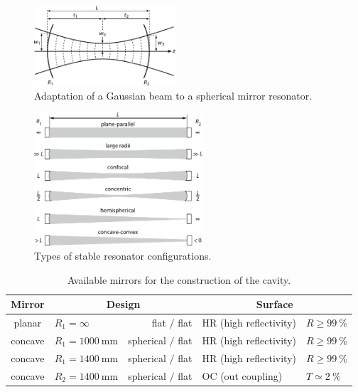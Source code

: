 \begin{figure}[H]
	\centering
	\includegraphics[width=0.47\textwidth]{content/graphics/beam.pdf}
	\caption{Adaptation of a Gaussian beam to a spherical mirror resonator. \cite{Eichler_2018}}
	\label{fig:beam}
\end{figure}

\begin{figure}[H]
	\centering
	\includegraphics[width=0.56\textwidth]{content/graphics/resonators.pdf}
	\caption{Types of stable resonator configurations. \cite{Eichler_2018}}
	\label{fig:resonators}
\end{figure}

\begin{table}
	\centering
	\caption{Available mirrors for the construction of the cavity.}
	\begin{tabular}{clrll}
		\toprule
		Mirror & \multicolumn{2}{c}{Design} & \multicolumn{2}{c}{Surface} \\
		\midrule
		planar  & $R_1 = \infty$ & flat $\mathbin{/}$ flat & HR (high reflectivity) & $R \geq \qty{99}{\percent}$ \\
		concave & $R_1 = \qty{1000}{\milli\meter}$ & spherical $\mathbin{/}$ flat & HR (high reflectivity) & $R \geq \qty{99}{\percent}$ \\
		concave & $R_1 = \qty{1400}{\milli\meter}$ & spherical $\mathbin{/}$ flat & HR (high reflectivity) & $R \geq \qty{99}{\percent}$ \\
		concave & $R_2 = \qty{1400}{\milli\meter}$ & spherical $\mathbin{/}$ flat & OC (out coupling) & $T \simeq \qty{2}{\percent}$ \\
		\bottomrule
	\end{tabular}
	\label{tab:config}
\end{table}

